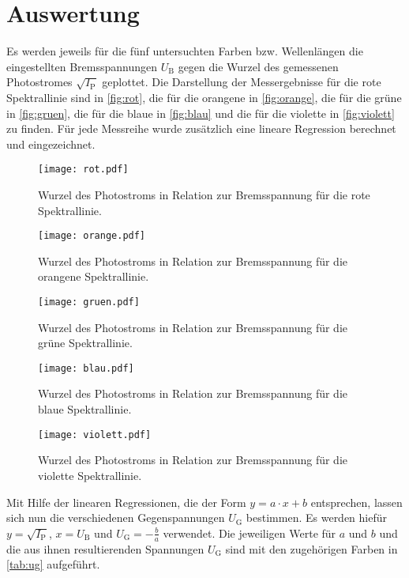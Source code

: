 \section{Auswertung}
\label{sec:Auswertung}

Es werden jeweils für die fünf untersuchten Farben bzw. Wellenlängen die eingestellten Bremsspannungen $U_\text{B}$ gegen die Wurzel des gemessenen Photostromes $\sqrt{I_\text{P}}$
geplottet. Die Darstellung der Messergebnisse für die rote Spektrallinie sind in \autoref{fig:rot}, die für die orangene in \autoref{fig:orange},
die für die grüne in \autoref{fig:gruen}, die für die blaue in \autoref{fig:blau} und die für die violette in \autoref{fig:violett} zu finden.
Für jede Messreihe wurde zusätzlich eine lineare Regression berechnet und eingezeichnet.

\begin{figure}[H]
  \centering
  \texttt{[image: rot.pdf]}
  \caption{Wurzel des Photostroms in Relation zur Bremsspannung für die rote Spektrallinie.}
  \label{fig:rot}
\end{figure}

\begin{figure}[H]
  \centering
  \texttt{[image: orange.pdf]}
  \caption{Wurzel des Photostroms in Relation zur Bremsspannung für die orangene Spektrallinie.}
  \label{fig:orange}
\end{figure}

\begin{figure}[H]
  \centering
  \texttt{[image: gruen.pdf]}
  \caption{Wurzel des Photostroms in Relation zur Bremsspannung für die grüne Spektrallinie.}
  \label{fig:gruen}
\end{figure}

\begin{figure}[H]
  \centering
  \texttt{[image: blau.pdf]}
  \caption{Wurzel des Photostroms in Relation zur Bremsspannung für die blaue Spektrallinie.}
  \label{fig:blau}
\end{figure}

\begin{figure}[H]
  \centering
  \texttt{[image: violett.pdf]}
  \caption{Wurzel des Photostroms in Relation zur Bremsspannung für die violette Spektrallinie.}
  \label{fig:violett}
\end{figure}

\noindent
Mit Hilfe der linearen Regressionen, die der Form $y=a \cdot x+b$ entsprechen, lassen sich nun die verschiedenen Gegenspannungen $U_\text{G}$ bestimmen. Es werden hiefür
$y=\sqrt{I_\text{P}}$, $x=U_\text{B}$ und $U_\text{G}=-\frac{b}{a}$ verwendet. Die jeweiligen Werte für $a$ und $b$ und die aus ihnen resultierenden Spannungen
$U_\text{G}$ sind mit den zugehörigen Farben in \autoref{tab:ug} aufgeführt.

